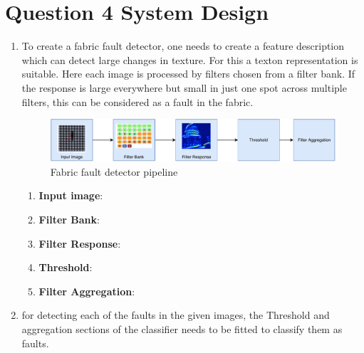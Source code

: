 \documentclass[12pt,letterpaper]{article}
\begin{document}
\section*{Question 4 System Design}
\begin{enumerate}[label=(\alph*)]
    \item To create a fabric fault detector, one needs to create a feature description which
    can detect large changes in texture. For this a texton representation is suitable.
    Here each image is processed by filters chosen from a filter bank. If the response
    is large everywhere but small in just one spot across multiple
    filters, this can be considered as a fault in the fabric.

    \begin{figure}[h!]
        \includegraphics[width=\linewidth]{fig/filters.pdf}
        \caption{Fabric fault detector pipeline}
    \end{figure}
    
    \begin{enumerate}
        \item \textbf{Input image}:
        \item \textbf{Filter Bank}:
        \item \textbf{Filter Response}:
        \item \textbf{Threshold}:
        \item \textbf{Filter Aggregation}:
    \end{enumerate}

    \item for detecting each of the faults in the given images, 
        the Threshold and aggregation sections of the classifier needs to be fitted to 
        classify them as faults. 
\end{enumerate}
\end{document}
